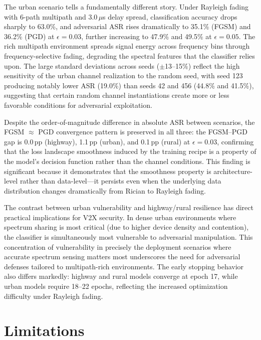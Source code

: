 \documentclass[conference]{IEEEtran}
\begin{document}
The urban scenario tells a fundamentally different story. Under Rayleigh fading with 6-path multipath and 3.0\,$\mu$s delay spread, classification accuracy drops sharply to 63.0\%, and adversarial ASR rises dramatically to 35.1\% (FGSM) and 36.2\% (PGD) at $\epsilon=0.03$, further increasing to 47.9\% and 49.5\% at $\epsilon=0.05$. The rich multipath environment spreads signal energy across frequency bins through frequency-selective fading, degrading the spectral features that the classifier relies upon. The large standard deviations across seeds ($\pm$13--15\%) reflect the high sensitivity of the urban channel realization to the random seed, with seed 123 producing notably lower ASR (19.0\%) than seeds 42 and 456 (44.8\% and 41.5\%), suggesting that certain random channel instantiations create more or less favorable conditions for adversarial exploitation.

Despite the order-of-magnitude difference in absolute ASR between scenarios, the FGSM $\approx$ PGD convergence pattern is preserved in all three: the FGSM--PGD gap is 0.0\,pp (highway), 1.1\,pp (urban), and 0.1\,pp (rural) at $\epsilon=0.03$, confirming that the loss landscape smoothness induced by the training recipe is a property of the model's decision function rather than the channel conditions. This finding is significant because it demonstrates that the smoothness property is architecture-level rather than data-level---it persists even when the underlying data distribution changes dramatically from Rician to Rayleigh fading.

The contrast between urban vulnerability and highway/rural resilience has direct practical implications for V2X security. In dense urban environments where spectrum sharing is most critical (due to higher device density and contention), the classifier is simultaneously most vulnerable to adversarial manipulation. This concentration of vulnerability in precisely the deployment scenarios where accurate spectrum sensing matters most underscores the need for adversarial defenses tailored to multipath-rich environments. The early stopping behavior also differs markedly: highway and rural models converge at epoch 17, while urban models require 18--22 epochs, reflecting the increased optimization difficulty under Rayleigh fading.

\section{Limitations}
\label{sec:limitations}
\end{document}
